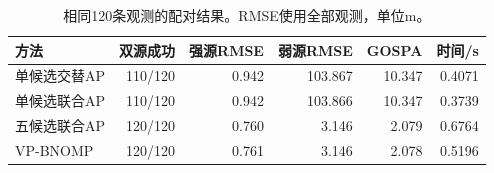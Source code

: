 \begin{table}[htbp]\centering\small
\caption{相同120条观测的配对结果。RMSE使用全部观测，单位m。}\label{tab:paired}
\begin{tabular}{@{}lrrrrr@{}}\toprule
方法 & 双源成功 & 强源RMSE & 弱源RMSE & GOSPA & 时间/s\\\midrule
单候选交替AP & 110/120 & 0.942 & 103.867 & 10.347 & 0.4071\\
单候选联合AP & 110/120 & 0.942 & 103.866 & 10.347 & 0.3739\\
五候选联合AP & 120/120 & 0.760 & 3.146 & 2.079 & 0.6764\\
VP-BNOMP & 120/120 & 0.761 & 3.146 & 2.078 & 0.5196\\
\bottomrule\end{tabular}\end{table}
